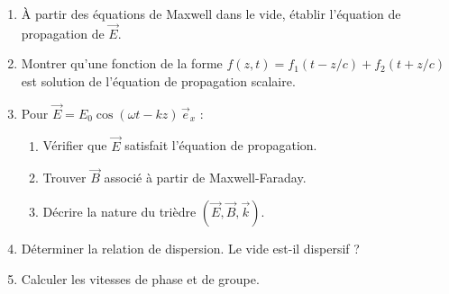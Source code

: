 \documentclass[12pt,a4paper]{article}
\begin{document}
\begin{boiteexercice}
\begin{enumerate}
  \item À partir des équations de Maxwell dans le vide, établir l'équation de propagation de $\vec{E}$.
  \item Montrer qu'une fonction de la forme $f(z,t) = f_1(t-z/c) + f_2(t+z/c)$ est solution de l'équation de propagation scalaire.
  \item Pour $\vec{E} = E_0\cos(\omega t - kz)\,\vec{e}_x$ :
  \begin{enumerate}[label=(\alph*)]
    \item Vérifier que $\vec{E}$ satisfait l'équation de propagation.
    \item Trouver $\vec{B}$ associé à partir de Maxwell-Faraday.
    \item Décrire la nature du trièdre $(\vec{E},\vec{B},\vec{k})$.
  \end{enumerate}
  \item Déterminer la relation de dispersion. Le vide est-il dispersif ?
  \item Calculer les vitesses de phase et de groupe.
\end{enumerate}
\end{boiteexercice}
\end{document}
